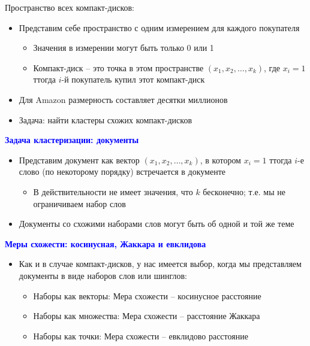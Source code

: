 \documentclass[landscape]{slides}
\begin{document}
\begin{normalsize}
\begin{slide}
Пространство всех компакт-дисков:
\begin{itemize}
\item Представим себе пространство с одним измерением для каждого покупателя
  \begin{itemize}
  \item Значения в измерении могут быть только 0 или 1
  \item Компакт-диск -- это точка в этом пространстве $(x_1,x_2,\ldots,x_k)$, где $x_i=1$ ттогда $i$-й покупатель купил этот компакт-диск
  \end{itemize}
\item Для Amazon размерность составляет десятки миллионов
\item Задача: найти кластеры схожих компакт-дисков
\end{itemize}
\end{slide}



\begin{slide}
\textbf{\textcolor{blue}{Задача кластеризации: документы}}

\begin{itemize}
\item Представим документ как вектор $(x_1,x_2,\ldots,x_k)$, в котором $x_i=1$ ттогда
$i$-е слово (по некоторому порядку) встречается в документе
  \begin{itemize}
  \item В действительности не имеет значения, что $k$ бесконечно; т.е. мы не ограничиваем набор слов
  \end{itemize}
\item Документы со схожими наборами слов могут быть об одной и той же теме
\end{itemize}
\end{slide}



\begin{slide}
\textbf{\textcolor{blue}{Меры схожести: косинусная, Жаккара и евклидова}}

\begin{itemize}
\item Как и в случае компакт-дисков, у нас имеется выбор, когда мы представляем документы
в виде наборов слов или шинглов:
  \begin{itemize}
  \item Наборы как векторы: Мера схожести -- косинусное расстояние
  \item Наборы как множества: Мера схожести -- расстояние Жаккара
  \item Наборы как точки: Мера схожести -- евклидово расстояние
  \end{itemize}
\end{itemize}
\end{slide}




\end{normalsize}
\end{document}
